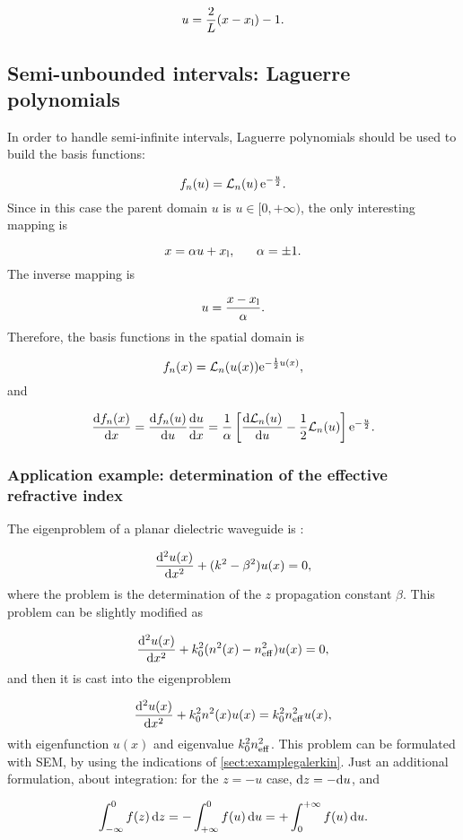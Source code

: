 \documentclass[a4paper,12pt]{article}
\begin{document}
\begin{equation}
u = \frac{2}{L} (x - x_{\mathrm{l}}) - 1.
\label{eq:invmapping}
\end{equation}

\subsection{Semi-unbounded intervals: Laguerre polynomials}

In order to handle semi-infinite intervals, Laguerre polynomials should be used to build the basis functions:

\[
f_n(u) = \mathcal{L}_n(u) \, \mathrm{e}^{-\frac{u}{2}}.
\]
Since in this case the parent domain $u$ is $u \in [0, + \infty)$, the only interesting mapping is

\[
x = \alpha u + x_{\mathrm{l}}, ~~~~~ \alpha = \pm 1.
\]
The inverse mapping is

\[
u = \frac{x - x_{\mathrm{l}}}{\alpha}.
\]
Therefore, the basis functions in the spatial domain is

\[
f_n(x) = \mathcal{L}_n(u(x)) \mathrm{e}^{- \frac{1}{2} u(x)},
\]
and

\[
\frac{\mathrm{d} f_n(x)}{\mathrm{d} x} = \frac{\mathrm{d} f_n(u)}{\mathrm{d} u} \frac{\mathrm{d} u}{\mathrm{d} x} = \frac{1}{\alpha} \left[ \frac{\mathrm{d} \mathcal{L}_n(u)}{\mathrm{d} u} - \frac{1}{2} \mathcal{L}_n(u) \right] \mathrm{e}^{- \frac{u}{2}}.
\]

\subsubsection{Application example: determination of the effective refractive index}

The eigenproblem of a planar dielectric waveguide is \cite{orta}:

\[
\frac{\mathrm{d}^2 u(x)}{\mathrm{d} x^2} + (k^2 - \beta^2) u(x) = 0,
\]
where the problem is the determination of the $z$ propagation constant $\beta$. This problem can be slightly modified as

\[
\frac{\mathrm{d}^2 u(x)}{\mathrm{d} x^2} + k_0^2 ( n^2(x) - n_{\mathrm{eff}}^2) u(x) = 0,
\]
and then it is cast into the eigenproblem

\[
\frac{\mathrm{d}^2 u(x)}{\mathrm{d} x^2} + k_0^2 n^2(x) u(x) = k_0^2 n_{\mathrm{eff}}^2 u(x),
\]
with eigenfunction $u(x)$ and eigenvalue $k_0^2 n_{\mathrm{eff}}^2$. This problem can be formulated with SEM, by using the indications of \ref{sect:examplegalerkin}. Just an additional formulation, about integration: for the $z = -u$ case, $\mathrm{d} z = - \mathrm{d} u$, and

\[
\int_{-\infty}^0 f(z) \, \mathrm{d} z = - \int_{+ \infty}^0 f(u) \, \mathrm{d} u = + \int_0^{+ \infty} f(u) \, \mathrm{d} u.
\]
\end{document}
